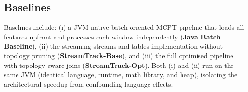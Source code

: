 \documentclass[review]{elsarticle}
\begin{document}

\subsection{Baselines}

Baselines include: (i) a JVM-native batch-oriented MCPT pipeline that loads all features upfront and processes each window independently (\textbf{Java Batch Baseline}), (ii) the streaming streams-and-tables implementation without topology pruning (\textbf{StreamTrack-Base}), and (iii) the full optimised pipeline with topology-aware joins (\textbf{StreamTrack-Opt}). Both (i) and (ii) run on the same JVM (identical language, runtime, math library, and heap), isolating the architectural speedup from confounding language effects.
\end{document}
